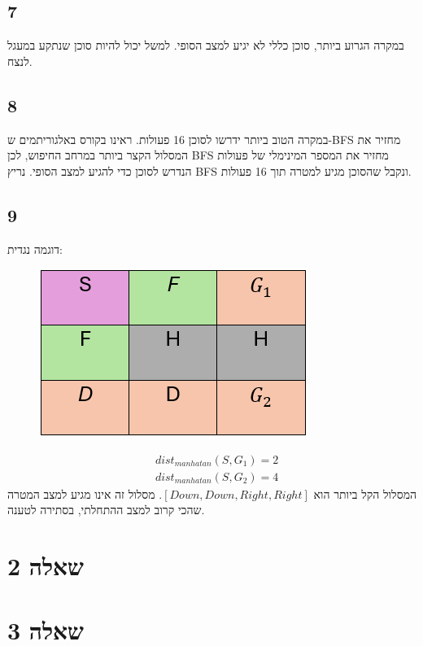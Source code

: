 \documentclass{article}
\begin{document}
\subsection*{7}
במקרה הגרוע ביותר, סוכן כללי לא יגיע למצב הסופי. למשל יכול להיות סוכן שנתקע במעגל לנצח.
\subsection*{8}
במקרה הטוב ביותר ידרשו לסוכן 16 פעולות. ראינו בקורס באלגוריתמים ש-BFS מחזיר את המסלול הקצר ביותר במרחב החיפוש, לכן BFS מחזיר את המספר המינימלי של פעולות הנדרש לסוכן כדי להגיע למצב הסופי. נריץ BFS ונקבל שהסוכן מגיע למטרה תוך 16 פעולות.
\subsection*{9}
דוגמה נגדית:
\begin{figure}[h]
	\includegraphics[scale=0.5]{1_9}
\end{figure}
\begin{align*}
&dist_{manhatan}(S,G_1) = 2\\
&dist_{manhatan}(S,G_2) = 4
\end{align*}
המסלול הקל ביותר הוא 
$[Down, Down, Right, Right]$.
מסלול זה אינו מגיע למצב המטרה שהכי קרוב למצב ההתחלתי, בסתירה לטענה.

\section{שאלה 2}
\section{שאלה 3}
\end{document}
